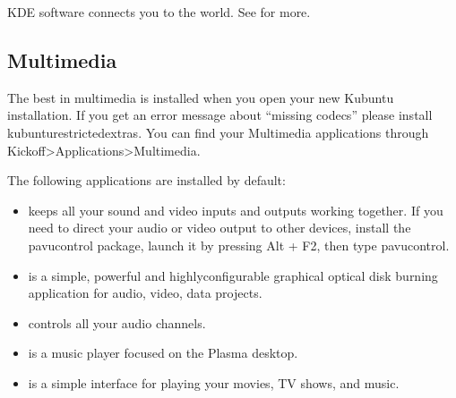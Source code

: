 \documentclass[letterpaper,10pt,english]{sphinxmanual}
\begin{document}
\sphinxAtStartPar
KDE software connects you to the world. See  for more.


\subsection{Multimedia}
\label{\detokenize{docs/software-management/software:multimedia}}
\sphinxAtStartPar
The best in multimedia is installed when you open your new Kubuntu installation. If you get an error message about “missing codecs” please install kubuntu\sphinxhyphen{}restricted\sphinxhyphen{}extras. You can find your Multimedia applications through Kickoff\sphinxhyphen{}\textgreater{}Applications\sphinxhyphen{}\textgreater{}Multimedia.

\sphinxAtStartPar
The following applications are installed by default:
\begin{itemize}
\item {} 
\sphinxAtStartPar
{} keeps all your sound and video inputs and outputs working together. If you need to direct your audio or video output to other devices, install the pavucontrol package, launch it by pressing Alt + F2, then type pavucontrol.

\item {} 
\sphinxAtStartPar
{} is a simple, powerful and highly\sphinxhyphen{}configurable graphical optical disk burning application for audio, video, data projects.

\item {} 
\sphinxAtStartPar
{} controls all your audio channels.

\item {} 
\sphinxAtStartPar
{} is a music player focused on the Plasma desktop.

\item {} 
\sphinxAtStartPar
{} is a simple interface for playing your movies, TV shows, and music.

\end{itemize}
\end{document}
